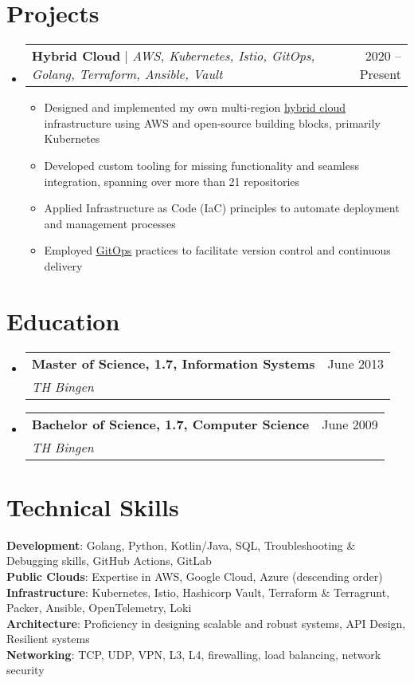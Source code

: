 \documentclass[letterpaper,11pt]{article}
\makeatletter
\newcommand{\resumeItem}[1]{
    \item\small{
            {#1 \vspace{-2pt}}
    }
}
\newcommand{\resumeSubheading}[4]{
    \vspace{-2pt}\item
    \begin{tabular*}{0.97\textwidth}[t]{l@{\extracolsep{\fill}}r}
        \textbf{#1} & #2 \\
        \textit{\small#3} & \textit{\small #4} \\
    \end{tabular*}\vspace{-7pt}
}
\newcommand{\resumeProjectHeading}[2]{
    \item
    \begin{tabular*}{0.97\textwidth}{l@{\extracolsep{\fill}}r}
        \small#1 & #2 \\
    \end{tabular*}\vspace{-7pt}
}
\newcommand{\resumeSubHeadingListStart}{\begin{itemize}[leftmargin=0.15in, label={}]}
\newcommand{\resumeSubHeadingListEnd}{\end{itemize}}
\newcommand{\resumeItemListStart}{\begin{itemize}}
\newcommand{\resumeItemListEnd}{\end{itemize}\vspace{-5pt}}
\makeatother
\begin{document}
\section{Projects}
\resumeSubHeadingListStart
\resumeProjectHeading
{\textbf{Hybrid Cloud} $|$ \emph{AWS, Kubernetes, Istio, GitOps, Golang, Terraform, Ansible, Vault}}{2020 -- Present}
\resumeItemListStart
\resumeItem{Designed and implemented my own multi-region \href{https://github.com/soerenschneider/soeren.cloud}{\underline{hybrid cloud}} infrastructure using AWS and open-source building blocks, primarily Kubernetes}
\resumeItem{Developed custom tooling for missing functionality and seamless integration, spanning over more than 21 repositories}
\resumeItem{Applied Infrastructure as Code (IaC) principles to automate deployment and management processes}
\resumeItem{Employed \href{https://github.com/soerenschneider/k8s-gitops}{\underline{GitOps}} practices to facilitate version control and continuous delivery}
\resumeItemListEnd
\resumeSubHeadingListEnd

\section{Education}
\resumeSubHeadingListStart
\resumeSubheading
{Master of Science, 1.7, Information Systems}{June 2013}
{TH Bingen}{}

\resumeSubheading
{Bachelor of Science, 1.7, Computer Science}{June 2009}
{TH Bingen}{}
\resumeSubHeadingListEnd

%
\section{Technical Skills}
\begin{itemize}[leftmargin=0.15in, label={}]
\small{\item{
\textbf{Development}{: Golang, Python, Kotlin/Java, SQL, Troubleshooting \& Debugging skills, GitHub Actions, GitLab} \\
\textbf{Public Clouds}{: Expertise in AWS, Google Cloud, Azure (descending order)} \\
\textbf{Infrastructure}{: Kubernetes, Istio, Hashicorp Vault, Terraform \& Terragrunt, Packer, Ansible, OpenTelemetry, Loki } \\
\textbf{Architecture}{: Proficiency in designing scalable and robust systems, API Design, Resilient systems } \\
\textbf{Networking}{: TCP, UDP, VPN, L3, L4, firewalling, load balancing, network security} \\
}}
\end{itemize}


\end{document}
